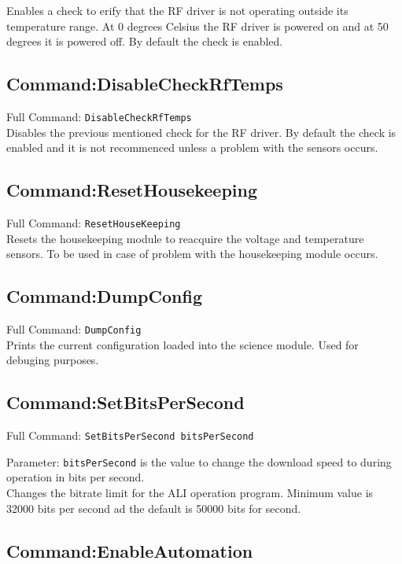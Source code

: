 Enables a check to erify that the RF driver is not operating outside its temperature range. At 0 degrees Celsius the RF driver is powered on and at 50 degrees it is powered off. By default the check is enabled.

\subsection{Command:DisableCheckRfTemps}

Full Command: \texttt{DisableCheckRfTemps}\\

Disables the previous mentioned check for the RF driver. By default the check is enabled and it is not recommenced unless a problem with the sensors occurs.

\subsection{Command:ResetHousekeeping}

Full Command: \texttt{ResetHouseKeeping}\\

Resets the housekeeping module to reacquire the voltage and temperature sensors. To be used in case of problem with the housekeeping module occurs.

\subsection{Command:DumpConfig}

Full Command: \texttt{DumpConfig}\\

Prints the current configuration loaded into the science module. Used for debuging purposes.

\subsection{Command:SetBitsPerSecond}

Full Command: \texttt{SetBitsPerSecond bitsPerSecond}

Parameter: \texttt{bitsPerSecond} is the value to change the download speed to during operation in bits per second.\\

Changes the bitrate limit for the ALI operation program. Minimum value is 32000 bits per second ad the default is 50000 bits for second.

\subsection{Command:EnableAutomation}

